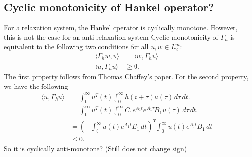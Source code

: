 \subsection{Cyclic monotonicity of Hankel operator?}
For a relaxation system, the Hankel operator is cyclically monotone. However, this is not the case for an anti-relaxation system
Cyclic monotonicity of $\Gamma_h$ is equivalent to the following two conditions for all $ u, w \in L_{2}^{m}$:
\begin{align}
    \langle \Gamma_h w,u\rangle &= \langle w, \Gamma_h u \rangle \\
    \langle u, \Gamma_h u \rangle &\geq 0.
\end{align}
The first property follows from Thomas Chaffey's paper. For the second property, we have the following
\begin{align*}
        \langle u, \Gamma_h u \rangle &= \int_{0}^{\infty} u^{T}(t)\int_{0}^{\infty}h(t+\tau)u(\tau) \, d\tau \, dt. \\
        &= \int_{0}^{\infty} u^{T}(t)\int_{0}^{\infty}C_1e^{A_1t}e^{A_1\tau}B_1u(\tau) \, d\tau \, dt. \\
        &= (-\int_{0}^{\infty}u(t)e^{A_1t}B_1 \, dt)^{T}\int_{0}^{\infty}u(t)e^{A_1t}B_1 \, dt \\
        &\leq 0.
\end{align*}
So it is cyclically anti-monotone? (Still does not change sign)

